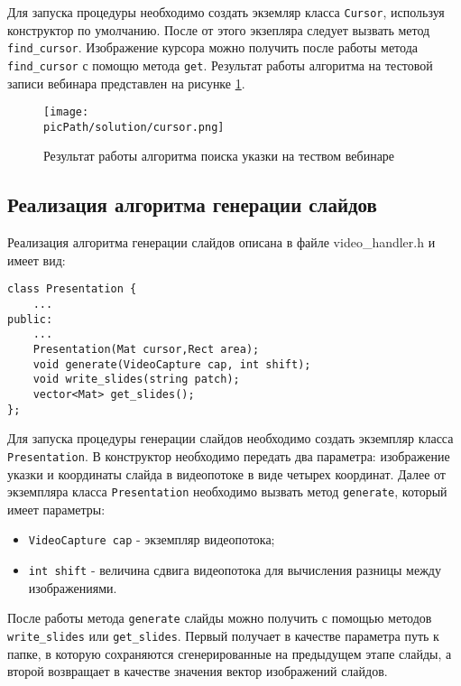 \documentclass[oneside,final,14pt]{extreport}
\newcommand{\picPath}{pictures}
\begin{document}
Для запуска процедуры необходимо создать экземляр класса \verb!Cursor!, используя конструктор по умолчанию. После от этого экзепляра следует вызвать метод \verb!find_cursor!. Изображение курсора можно получить после работы метода \verb!find_cursor! с помощю метода \verb!get!. Результат работы алгоритма на тестовой записи вебинара представлен на рисунке \ref{Solution:cursor}.

\begin{figure}[H]
\begin{center}
\texttt{[image: \\picPath/solution/cursor.png]}
\end{center}
  \caption{ Результат работы алгоритма поиска указки на теством вебинаре}
  \label{Solution:cursor}
\end{figure}

\subsection{Реализация алгоритма генерации слайдов}
 
Реализация алгоритма генерации слайдов описана в файле video\_handler.h и имеет вид:

\begin{verbatim}
class Presentation {
	...
public:
	...
    Presentation(Mat cursor,Rect area);
    void generate(VideoCapture cap, int shift);
    void write_slides(string patch);
    vector<Mat> get_slides();
};
\end{verbatim}
 
 Для запуска процедуры генерации слайдов необходимо создать экземпляр класса \verb!Presentation!. В конструктор необходимо передать два параметра: изображение указки и координаты слайда в видеопотоке в виде четырех координат. Далее от экземпляра класса \verb!Presentation! необходимо вызвать метод \verb!generate!, который имеет параметры:
\begin{itemize}
\item \verb!VideoCapture cap! - экземпляр видеопотока;
\item \verb!int shift! - величина сдвига видеопотока для вычисления разницы между изображениями. 
\end{itemize} 

После работы метода \verb!generate! слайды можно получить с помощью методов \verb!write_slides! или \verb!get_slides!.  Первый получает в качестве параметра путь к папке, в которую сохраняются сгенерированные на предыдущем этапе слайды, а второй возвращает в качестве значения  вектор изображений слайдов. 
\end{document}
